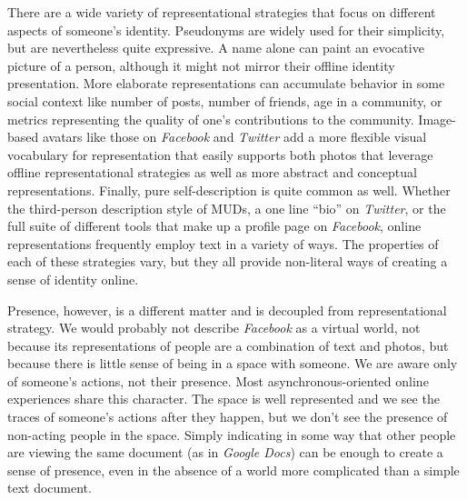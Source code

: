 There are a wide variety of representational strategies that focus on different aspects of someone's identity. Pseudonyms are widely used for their simplicity, but are nevertheless quite expressive. A name alone can paint an evocative picture of a person, although it might not mirror their offline identity presentation. \citep{Jacobson:1996tb} More elaborate representations can accumulate behavior in some social context like number of posts, number of friends, age in a community, or metrics representing the quality of one's contributions to the community. Image-based avatars like those on \emph{Facebook} and \emph{Twitter} add a more flexible visual vocabulary for representation that easily supports both photos that leverage offline representational strategies as well as more abstract and conceptual representations. Finally, pure self-description is quite common as well. Whether the third-person description style of MUDs, a one line ``bio'' on \emph{Twitter}, or the full suite of different tools that make up a profile page on \emph{Facebook}, online representations frequently employ text in a variety of ways. The properties of each of these strategies vary, but they all provide non-literal ways of creating a sense of identity online. 

Presence, however, is a different matter and is decoupled from representational strategy. We would probably not describe \emph{Facebook} as a virtual world, not because its representations of people are a combination of text and photos, but because there is little sense of being in a space with someone. We are aware only of someone's actions, not their presence. Most asynchronous-oriented online experiences share this character. The space is well represented and we see the traces of someone's actions after they happen, but we don't see the presence of non-acting people in the space. Simply indicating in some way that other people are viewing the same document (as in \emph{Google Docs}) can be enough to create a sense of presence, even in the absence of a world more complicated than a simple text document. 



%
%



